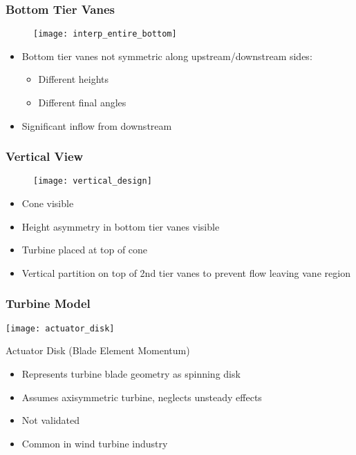 \documentclass[mathserif]{beamer}
\begin{document}
%
%
\begin{frame}
 \frametitle{Bottom Tier Vanes}
    \begin{figure}[htb]
     \centering
     \texttt{[image: interp\_entire\_bottom]}
    \end{figure}
 
 \begin{block}{}
  \begin{itemize}
   \item Bottom tier vanes not symmetric along upstream/downstream
	 sides:
	 \begin{itemize}
	  \item Different heights
	  \item Different final angles
	 \end{itemize}
   \item Significant inflow from downstream
  \end{itemize}
 \end{block}
\end{frame}


\begin{frame}
 \frametitle{Vertical View}
    \begin{figure}[htb]
     \centering
     \texttt{[image: vertical\_design]}
    \end{figure}
 
 \begin{block}{}
  \begin{itemize}
   \item Cone visible
   \item Height asymmetry in bottom tier vanes visible
   \item Turbine placed at top of cone
   \item Vertical partition on top of 2nd tier vanes to prevent flow
	 leaving vane region 
  \end{itemize}
 \end{block}
\end{frame}


%
%
\begin{frame}
 \frametitle{Turbine Model}

 \begin{center}
  \texttt{[image: actuator\_disk]}
 \end{center}
 
 \begin{block}{Actuator Disk (Blade Element Momentum)}
  \begin{itemize}
  \item Represents turbine blade geometry as spinning disk
  \item Assumes axisymmetric turbine, neglects unsteady effects
  \item Not validated
  \item Common in wind turbine industry
  \end{itemize}
 \end{block}

\end{frame}
\end{document}
